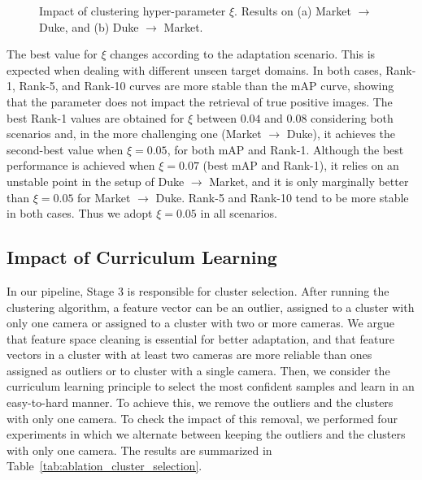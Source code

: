 \documentclass[journal]{IEEEtran}
\begin{document}
\begin{figure}[ht]
\centering
{}
\hfil
{}
\caption{Impact of clustering hyper-parameter $ \xi $. Results on (a) Market $ \rightarrow $ Duke, and (b) Duke $ \rightarrow $ Market.}
\label{fig:ablation_study_xi}
\end{figure}

The best value for $ \xi $ changes according to the adaptation scenario. This is expected when dealing with different unseen target domains. In both cases, Rank-1, Rank-5, and Rank-10 curves are more stable than the mAP curve, showing that the parameter does not impact the retrieval of true positive images. The best Rank-1 values are obtained for $ \xi $ between $0.04$ and $0.08$ considering both scenarios and, in the more challenging one (Market $ \rightarrow $ Duke), it achieves the second-best value when $ \xi = 0.05$, for both mAP and Rank-1. Although the best performance is achieved when $\xi = 0.07$ (best mAP and Rank-1), it relies on an unstable point in the setup of Duke $\rightarrow$ Market, and it is only marginally better than $\xi = 0.05 $ for Market $\rightarrow $ Duke. Rank-5 and Rank-10 tend to be more stable in both cases. Thus we adopt $ \xi = 0.05 $ in all scenarios.

\subsection{Impact of Curriculum Learning}

In our pipeline, Stage 3 is responsible for cluster selection. After running the clustering algorithm, a feature vector can be an outlier, assigned to a cluster with only one camera or assigned to a cluster with two or more cameras. We argue that feature space cleaning is essential for better adaptation, and that feature vectors in a cluster with at least two cameras are more reliable than ones assigned as outliers or to cluster with a single camera. Then, we consider the curriculum learning principle to select the most confident samples and learn in an easy-to-hard manner. To achieve this, we remove the outliers and the clusters with only one camera. To check the impact of this removal, we performed four experiments in which we alternate between keeping the outliers and the clusters with only one camera. The results are summarized in Table~\ref{tab:ablation_cluster_selection}.
\end{document}

